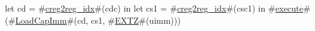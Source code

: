 let cd = #\hyperref[sailRISCVzcreg2regzyidx]{creg2reg\_idx}#(cdc) in
let cs1 = #\hyperref[sailRISCVzcreg2regzyidx]{creg2reg\_idx}#(csc1) in
#\hyperref[sailRISCVzexecute]{execute}#(#\hyperref[sailRISCVzLoadCapImm]{LoadCapImm}#(cd, cs1, #\hyperref[sailRISCVzEXTZ]{EXTZ}#(uimm)))
